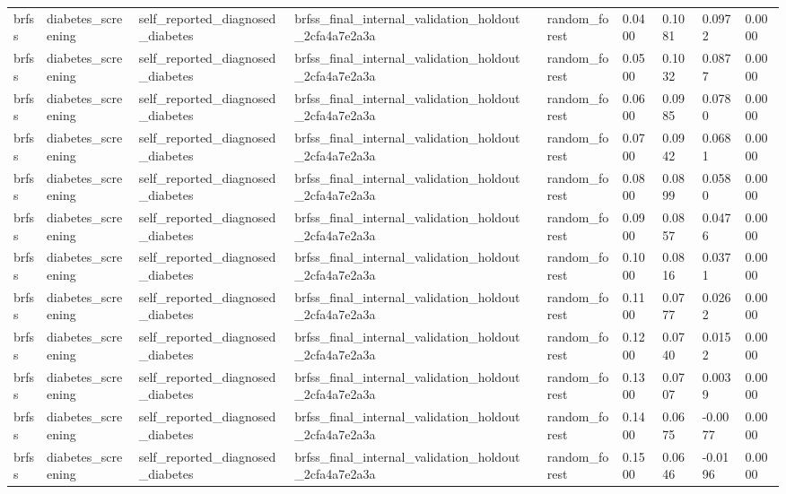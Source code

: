 \begin{tabular}{llllllllll}
brfss & diabetes\_screening & self\_reported\_diagnosed\_diabetes & brfss\_final\_internal\_validation\_holdout\_2cfa4a7e2a3a &  & random\_forest & 0.0400 & 0.1081 & 0.0972 & 0.0000 \\
brfss & diabetes\_screening & self\_reported\_diagnosed\_diabetes & brfss\_final\_internal\_validation\_holdout\_2cfa4a7e2a3a &  & random\_forest & 0.0500 & 0.1032 & 0.0877 & 0.0000 \\
brfss & diabetes\_screening & self\_reported\_diagnosed\_diabetes & brfss\_final\_internal\_validation\_holdout\_2cfa4a7e2a3a &  & random\_forest & 0.0600 & 0.0985 & 0.0780 & 0.0000 \\
brfss & diabetes\_screening & self\_reported\_diagnosed\_diabetes & brfss\_final\_internal\_validation\_holdout\_2cfa4a7e2a3a &  & random\_forest & 0.0700 & 0.0942 & 0.0681 & 0.0000 \\
brfss & diabetes\_screening & self\_reported\_diagnosed\_diabetes & brfss\_final\_internal\_validation\_holdout\_2cfa4a7e2a3a &  & random\_forest & 0.0800 & 0.0899 & 0.0580 & 0.0000 \\
brfss & diabetes\_screening & self\_reported\_diagnosed\_diabetes & brfss\_final\_internal\_validation\_holdout\_2cfa4a7e2a3a &  & random\_forest & 0.0900 & 0.0857 & 0.0476 & 0.0000 \\
brfss & diabetes\_screening & self\_reported\_diagnosed\_diabetes & brfss\_final\_internal\_validation\_holdout\_2cfa4a7e2a3a &  & random\_forest & 0.1000 & 0.0816 & 0.0371 & 0.0000 \\
brfss & diabetes\_screening & self\_reported\_diagnosed\_diabetes & brfss\_final\_internal\_validation\_holdout\_2cfa4a7e2a3a &  & random\_forest & 0.1100 & 0.0777 & 0.0262 & 0.0000 \\
brfss & diabetes\_screening & self\_reported\_diagnosed\_diabetes & brfss\_final\_internal\_validation\_holdout\_2cfa4a7e2a3a &  & random\_forest & 0.1200 & 0.0740 & 0.0152 & 0.0000 \\
brfss & diabetes\_screening & self\_reported\_diagnosed\_diabetes & brfss\_final\_internal\_validation\_holdout\_2cfa4a7e2a3a &  & random\_forest & 0.1300 & 0.0707 & 0.0039 & 0.0000 \\
brfss & diabetes\_screening & self\_reported\_diagnosed\_diabetes & brfss\_final\_internal\_validation\_holdout\_2cfa4a7e2a3a &  & random\_forest & 0.1400 & 0.0675 & -0.0077 & 0.0000 \\
brfss & diabetes\_screening & self\_reported\_diagnosed\_diabetes & brfss\_final\_internal\_validation\_holdout\_2cfa4a7e2a3a &  & random\_forest & 0.1500 & 0.0646 & -0.0196 & 0.0000 \\

\end{tabular}

